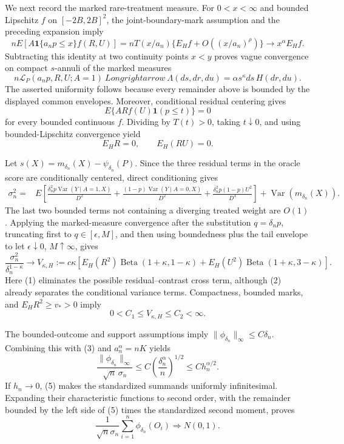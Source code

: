 We next record the marked rare-treatment measure.  For \(0<x<\infty\) and bounded Lipschitz \(f\) on \([-2B,2B]^2\), the joint-boundary-mark assumption and the preceding expansion imply
\[
 nE\!\left[A\mathbf1\{a_np\leq x\}f(R,U)\right]
 =nT(x/a_n)\{E_Hf+O((x/a_n)^\rho)\}
 \longrightarrow x^\alpha E_Hf.
\]
Subtracting this identity at two continuity points \(x<y\) proves vague convergence on compact \(s\)-annuli of the marked measures
\[
 n\mathcal L_P(a_np,R,U;A=1)
 \ Longrightarrow\ 
 \Lambda(ds,dr,du)=\alpha s^\kappa ds\,H(dr,du).
\]
The asserted uniformity follows because every remainder above is bounded by the displayed common envelopes.  Moreover, conditional residual centering gives
\[
 E\{A R f(U)\mathbf1(p\leq t)\}=0
\]
for every bounded continuous \(f\).  Dividing by \(T(t)>0\), taking \(t\downarrow0\), and using bounded-Lipschitz convergence yield
\[
 E_HR=0,\qquad E_H(RU)=0. \tag{1}
\]

Let \(s(X)=m_{\delta_n}(X)-\psi_{\delta_n}(P)\).  Since the three residual terms in the oracle score are conditionally centered, direct conditioning gives
\[
\begin{split}
 \sigma_n^2={}&E\!\left[
 \frac{\delta_n^2p\operatorname{Var}(Y\mid A=1,X)}{D^2}
 +\frac{(1-p)\operatorname{Var}(Y\mid A=0,X)}{D^2}
 +\frac{\delta_n^2p(1-p)U^2}{D^4}
 \right]+\operatorname{Var}(m_{\delta_n}(X)).
\end{split} \tag{2}
\]
The last two bounded terms not containing a diverging treated weight are \(O(1)\).  Applying the marked-measure convergence after the substitution \(q=\delta_np\), truncating first to \(q\in[\epsilon,M]\), and then using boundedness plus the tail envelope to let \(\epsilon\downarrow0\), \(M\uparrow\infty\), gives
\[
 \frac{\sigma_n^2}{\delta_n^{1-\kappa}}
 \longrightarrow V_{\kappa,H}:=c\kappa\!\left[
 E_H(R^2)\operatorname{Beta}(1+\kappa,1-\kappa)
 +E_H(U^2)\operatorname{Beta}(1+\kappa,3-\kappa)
 \right]. \tag{3}
\]
Here (1) eliminates the possible residual--contrast cross term, although (2) already separates the conditional variance terms.  Compactness, bounded marks, and \(E_HR^2\geq v_*>0\) imply
\[
 0<C_1\leq V_{\kappa,H}\leq C_2<\infty. \tag{4}
\]

The bounded-outcome and support assumptions imply \(\|\phi_{\delta_n}\|_\infty\leq C\delta_n\).  Combining this with (3) and \(a_n^\alpha=nK\) yields
\[
 \frac{\|\phi_{\delta_n}\|_\infty}{\sqrt n\,\sigma_n}
 \leq C\left(\frac{\delta_n^\alpha}{n}\right)^{1/2}
 \leq C h_n^{\alpha/2}. \tag{5}
\]
If \(h_n\to0\), (5) makes the standardized summands uniformly infinitesimal.  Expanding their characteristic functions to second order, with the remainder bounded by the left side of (5) times the standardized second moment, proves
\[
 \frac{1}{\sqrt n\sigma_n}\sum_{i=1}^n\phi_{\delta_n}(O_i)\Rightarrow N(0,1). \tag{6}
\]


